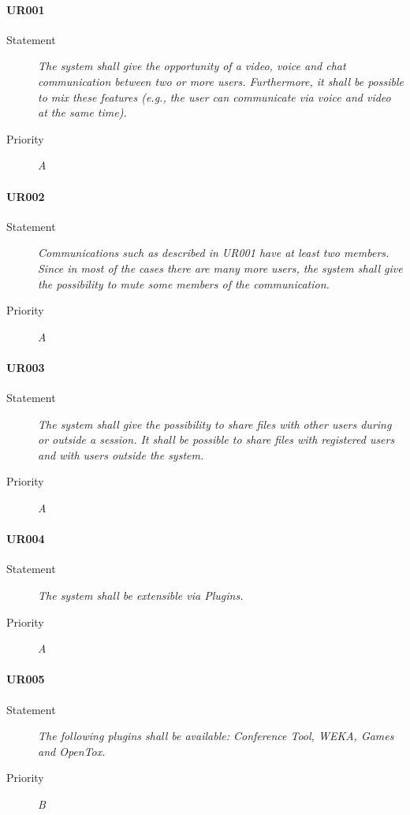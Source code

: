 \paragraph{UR001}
\begin{description}
\item [Statement] \textit{The system shall give the opportunity of a video,
    voice and chat communication between two or more users. Furthermore, it
    shall be possible to mix these features (e.g., the user can communicate
    via voice and video at the same time).}
\item [Priority] \textit{A}
\end{description}

\paragraph{UR002}
\begin{description}
\item[Statement] \textit{Communications such as described in UR001 have at
    least two members. Since in most of the cases there are many more users,
    the system shall give the possibility to mute some members of the
    communication.}
\item[Priority] \textit{A}
\end{description}

\paragraph{UR003}
\begin{description}
\item[Statement] \textit{The system shall give the possibility to share files
    with other users during or outside a session. It shall be possible to
    share files with registered users and with users outside the system.}
\item[Priority] \textit{A}
\end{description}

\paragraph{UR004}
\begin{description}
\item[Statement] \textit{The system shall be extensible via \gls{Plugins}.}
\item[Priority] \textit{A}
\end{description}

\paragraph{UR005}
\begin{description}
\item[Statement] \textit{The following plugins shall be available: Conference
    Tool, WEKA, Games and OpenTox.}
\item[Priority] \textit{B}
\end{description}

